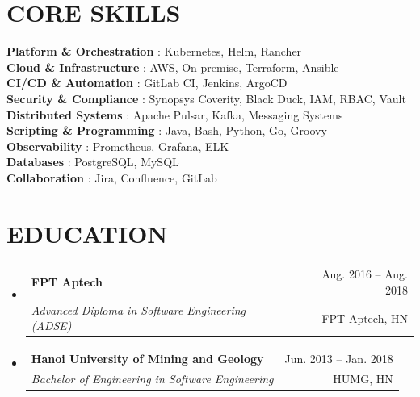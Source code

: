 \documentclass[letterpaper,11pt]{article}
\makeatletter
\newcommand{\resumeSubheading}[4]{
  \vspace{-1pt}\item
    \begin{tabular*}{\textwidth}[t]{l@{\extracolsep{\fill}}r}
      \textbf{#1} & {\color{dark-grey}\small #2}\vspace{1pt}\\ %
      \textit{#3} & {\color{dark-grey} \small #4}\\ %
    \end{tabular*}\vspace{-4pt}
}
\newcommand{\resumeSubHeadingListStart}{\begin{itemize}[leftmargin=0in, label={}]}
\newcommand{\resumeSubHeadingListEnd}{\end{itemize}}
\makeatother
\begin{document}
\section{CORE SKILLS}
\begin{itemize}[leftmargin=0in, label={}]
\small{\item{
 \textbf{Platform \& Orchestration} {: Kubernetes, Helm, Rancher} \\ 
 \textbf{Cloud \& Infrastructure} {: AWS, On-premise, Terraform, Ansible} \\
 \textbf{CI/CD \& Automation} {: GitLab CI, Jenkins, ArgoCD} \\
 \textbf{Security \& Compliance} {: Synopsys Coverity, Black Duck, IAM, RBAC, Vault} \\
 \textbf{Distributed Systems} {: Apache Pulsar, Kafka, Messaging Systems} \\
 \textbf{Scripting \& Programming} {: Java, Bash, Python, Go, Groovy} \\
 \textbf{Observability} {: Prometheus, Grafana, ELK} \\
 \textbf{Databases} {: PostgreSQL, MySQL} \\
 \textbf{Collaboration} {: Jira, Confluence, GitLab}
}}
\end{itemize}

\section{EDUCATION}
\resumeSubHeadingListStart

  \resumeSubheading
    {FPT Aptech}{Aug. 2016 -- Aug. 2018}
    {Advanced Diploma in Software Engineering (ADSE)}{FPT Aptech, HN}

  \resumeSubheading
    {Hanoi University of Mining and Geology}{Jun. 2013 -- Jan. 2018}
    {Bachelor of Engineering in Software Engineering}{HUMG, HN}

\resumeSubHeadingListEnd
\end{document}
